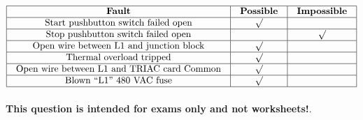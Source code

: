 






$$\vbox{\offinterlineskip
\halign{\strut
\vrule \quad\hfil # \ \hfil & 
\vrule \quad\hfil # \ \hfil & 
\vrule \quad\hfil # \ \hfil \vrule \cr
\noalign{\hrule}
%
{\bf Fault} & {\bf Possible} & {\bf Impossible} \cr
%
\noalign{\hrule}
%
Start pushbutton switch failed open & $\surd$ &  \cr
%
\noalign{\hrule}
%
Stop pushbutton switch failed open &  & $\surd$ \cr
%
\noalign{\hrule}
%
Open wire between L1 and junction block & $\surd$ &  \cr
%
\noalign{\hrule}
%
Thermal overload tripped & $\surd$ &  \cr
%
\noalign{\hrule}
%
Open wire between L1 and TRIAC card Common & $\surd$ &  \cr
%
\noalign{\hrule}
%
Blown ``L1'' 480 VAC fuse & $\surd$ &  \cr
%
\noalign{\hrule}
} %
}$$ %







{\bf This question is intended for exams only and not worksheets!}.


